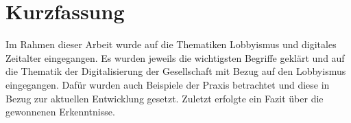 \documentclass[12pt,a4paper,bibliography=totocnumbered,listof=totocnumbered]{scrartcl}
\begin{document}
\setcounter{page}{1}
\onehalfspacing
{}
\section{Kurzfassung}
Im Rahmen dieser Arbeit wurde auf die Thematiken Lobbyismus und digitales Zeitalter eingegangen. Es wurden jeweils die wichtigsten Begriffe geklärt und auf die Thematik der Digitalisierung der Gesellschaft mit Bezug auf den Lobbyismus eingegangen. Dafür wurden auch Beispiele der Praxis betrachtet und diese in Bezug zur aktuellen Entwicklung gesetzt. Zuletzt erfolgte ein Fazit über die gewonnenen Erkenntnisse.  

\pagebreak

\renewcommand{\cfttabpresnum}{Tab. }
\renewcommand{\cftfigpresnum}{Abb. }
\settowidth{\cfttabnumwidth}{Abb. 10\quad}
\settowidth{\cftfignumwidth}{Abb. 10\quad}

\singlespacing
{}
\renewcommand{\contentsname}{II Inhaltsverzeichnis}
{}
\addtocounter{section}{1}
\tableofcontents
\pagebreak
{}
\listoffigures
\pagebreak

\end{document}

